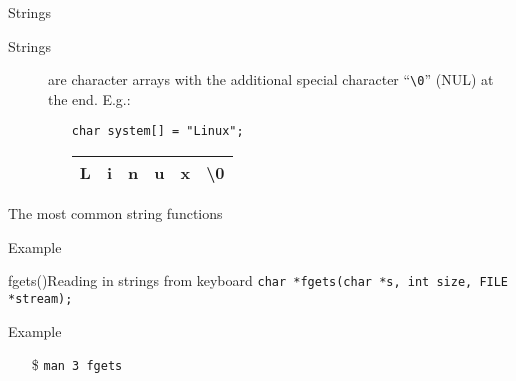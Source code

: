 \begin{frame}[fragile=singleslide]{Strings}
  \begin{description}
  \item[Strings] are \alert{character arrays} with the additional special character ``\verb|\0|''
    (NUL) at the end. E.g.:
    \begin{itemize}
    \item[] \texttt{char system[] = "Linux";}
    \item[] \ttfamily\begin{tabular}{*{6}{|c}|} \hline
              L&i&n&u&x&\textbackslash0\\\hline
            \end{tabular}
          \end{itemize}
  \end{description}
  \begin{block}{The most common string functions}
    \begin{center}
    \end{center}
  \end{block}
\end{frame}

\begin{frame}
  \begin{block}{Example}
    \begin{center}
    \end{center}
  \end{block}
\end{frame}

\begin{frame}[fragile=singleslide]{fgets()}{Reading in strings from keyboard}
  \texttt{char *fgets(char *s, int size, FILE *stream);}
  \begin{block}{Example}
    \begin{center}
    \end{center}
  \end{block}
  \begin{itemize}
  \item[\$] \texttt{man 3 fgets}
  \end{itemize}
\end{frame}

